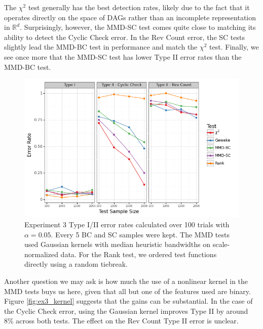 \documentclass[a4paper,11pt]{article}
\begin{document}
The $\chi^{2}$ test generally has the best detection rates, likely due to the fact that it operates directly on the space of DAGs rather than an incomplete representation in $\mathbb{R}^{d}$. Surprisingly, however, the MMD-SC test comes quite close to matching its ability to detect the Cyclic Check error. In the Rev Count error, the SC tests slightly lead the MMD-BC test in performance and match the $\chi^{2}$ test. Finally, we see once more that the MMD-SC test has lower Type II error rates than the MMD-BC test.

\begin{figure}[H]
    \centering
    \includegraphics[width=\textwidth]{figures/graph_comparison.png}
    \caption{Experiment 3 Type I/II error rates calculated over 100 trials with $\alpha=0.05$. Every 5 BC and SC samples were kept. The MMD tests used Gaussian kernels with median heuristic bandwidths on scale-normalized data. For the Rank test, we ordered test functions directly using a random tiebreak.}
    \label{fig:ex3_comparison}
\end{figure}

Another question we may ask is how much the use of a nonlinear kernel in the MMD tests buys us here, given that all but one of the features used are binary. Figure \ref{fig:ex3_kernel} suggests that the gains can be substantial. In the case of the Cyclic Check error, using the Gaussian kernel improves Type II by around 8\% across both tests. The effect on the Rev Count Type II error is unclear.
\end{document}
